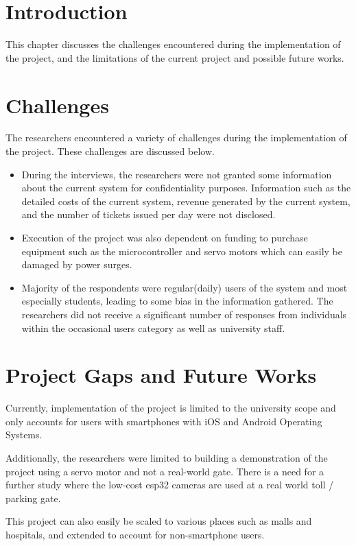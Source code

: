 \section{Introduction}
This chapter discusses the challenges encountered during the implementation of the project, and the limitations of the current project and possible future works.


\section{Challenges}
The researchers encountered a variety of challenges during the implementation of the project. These challenges are discussed below.

\begin{itemize}
    \item During the interviews, the researchers were not granted some information about the current system for confidentiality purposes. Information such as the detailed costs of the current system, revenue generated by the current system, and the number of tickets issued per day were not disclosed.
    \item Execution of the project was also dependent on funding to purchase equipment such as the microcontroller and servo motors which can easily be damaged by power surges.
    \item Majority of the respondents were regular(daily) users of the system and most especially students, leading to some bias in the information gathered. The researchers did not receive a significant number of responses from individuals within the occasional users category as well as university staff.
\end{itemize}


\section{Project Gaps and Future Works}
Currently, implementation of the project is limited to the university scope and only accounts for users with smartphones with iOS and Android Operating Systems.

Additionally, the researchers were limited to building a demonstration of the project using a servo motor and not a real-world gate. There is a need for a further study where the low-cost esp32 cameras are used at a real world toll / parking gate.

This project can also easily be scaled to various places such as malls and hospitals, and extended to account for non-smartphone users.


